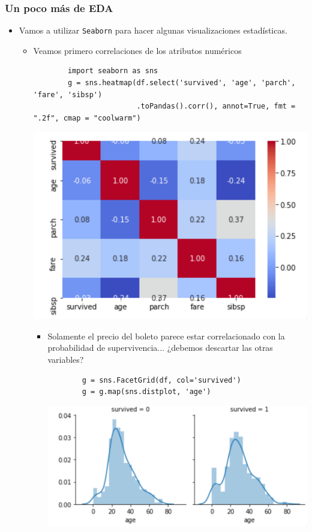 \documentclass[leqno, 10pt, envcountsect]{beamer}
\numberwithin{equation}{section}
\theoremstyle{definition}
\theoremstyle{example}
\numberwithin{figure}{section}
\numberwithin{table}{section}
\let\olditem\item
\renewcommand{\item}{%
\olditem\vspace{1pt}}
\begin{document}
\begin{frame}[fragile=singleslide]
  \frametitle{Un poco más de EDA}
  \begin{itemize}
    \item Vamos a utilizar \texttt{Seaborn} para hacer algunas visualizaciones
      estadísticas.
      \begin{itemize}
        \item Veamos primero correlaciones de los atributos numéricos
        \begin{verbatim}
        import seaborn as sns
        g = sns.heatmap(df.select('survived', 'age', 'parch', 'fare', 'sibsp')
                        .toPandas().corr(), annot=True, fmt = ".2f", cmap = "coolwarm")
        \end{verbatim}
        \begin{center}
          \includegraphics[scale=0.15]{corr.png}
        \end{center}
        \begin{itemize}
          \item Solamente el precio del boleto parece estar correlacionado con
            la probabilidad de supervivencia... ¿debemos descartar las otras
            variables?
        \begin{verbatim}
        g = sns.FacetGrid(df, col='survived')
        g = g.map(sns.distplot, 'age')
        \end{verbatim}
        \begin{center}
          \includegraphics[scale=0.14]{facet.png}
        \end{center}
        \end{itemize}
      \end{itemize}
  \end{itemize}
\end{frame}
\end{document}

